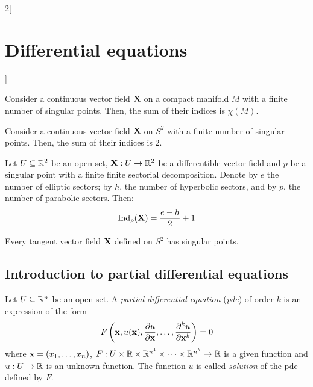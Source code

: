 \documentclass[../../../main_math.tex]{subfiles}
\begin{document}
\begin{multicols}{2}[\section{Differential equations}]
  \begin{theorem}
    Consider a continuous vector field $\boldsymbol{\mathrm{X}}$ on a compact manifold $M$ with a finite number of singular points. Then, the sum of their indices is $\chi(M)$.
  \end{theorem}
  \begin{corollary}
    Consider a continuous vector field $\boldsymbol{\mathrm{X}}$ on $S^2$ with a finite number of singular points. Then, the sum of their indices is 2.
  \end{corollary}
  \begin{proposition}
    Let $U\subseteq \mathbb{R}^2$ be an open set, $\boldsymbol{\mathrm{X}}:U\rightarrow\mathbb{R}^2$ be a differentible vector field and $p$ be a singular point with a finite finite sectorial decomposition. Denote by $e$ the number of elliptic sectors; by $h$, the number of hyperbolic sectors, and by $p$, the number of parabolic sectors. Then: $$\operatorname{Ind}_{p}(\boldsymbol{\mathrm{X}})=\frac{e-h}{2}+1$$
  \end{proposition}
  \begin{corollary}
    Every tangent vector field $\boldsymbol{\mathrm{X}}$ defined on $S^2$ has singular points.
  \end{corollary}
  \subsection{Introduction to partial differential equations}
  \begin{definition}
    Let $U\subseteq \mathbb{R}^n$ be an open set. A \emph{partial differential equation} (\emph{pde}) of order $k$ is an expression of the form $$F\left(\boldsymbol{\mathrm{x}},u(\boldsymbol{\mathrm{x}}),\pdv{u}{\boldsymbol{\mathrm{x}}},\ldots,\pdv[k]{u}{\boldsymbol{\mathrm{x}}}\right)=0$$ where $\boldsymbol{\mathrm{x}}=(x_1,\ldots,x_n)$, $F:U\times\mathbb{R}\times\mathbb{R}^{n^1}\times\cdots\times\mathbb{R}^{n^k}\rightarrow\mathbb{R}$ is a given function and $u:U\rightarrow \mathbb{R}$ is an unknown function. The function $u$ is called \emph{solution} of the pde defined by $F$.
  \end{definition}

\end{multicols}
\end{document}
